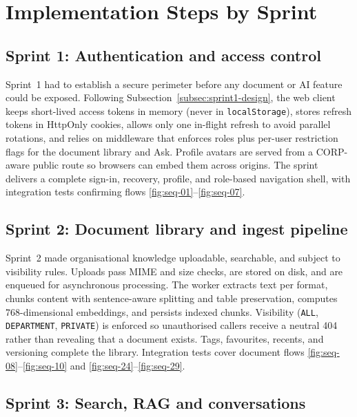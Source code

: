 \section{Implementation Steps by Sprint}

\subsection{Sprint 1: Authentication and access control}
\label{subsec:impl-sprint1}

Sprint~1 had to establish a secure perimeter before any document or AI feature
could be exposed. Following Subsection~\ref{subsec:sprint1-design}, the web
client keeps short-lived access tokens in memory (never in \texttt{localStorage}),
stores refresh tokens in HttpOnly cookies, allows only one in-flight refresh to
avoid parallel rotations, and relies on middleware that enforces roles plus
per-user restriction flags for the document library and Ask. Profile avatars are
served from a CORP-aware public route so browsers can embed them across origins.
The sprint delivers a complete sign-in, recovery, profile, and role-based
navigation shell, with integration tests confirming flows
\ref{fig:seq-01}--\ref{fig:seq-07}.



\subsection{Sprint 2: Document library and ingest pipeline}
\label{subsec:impl-sprint2}

Sprint~2 made organisational knowledge uploadable, searchable, and subject to
visibility rules. Uploads pass MIME and size checks, are stored on disk, and are
enqueued for asynchronous processing. The worker extracts text per format, chunks
content with sentence-aware splitting and table preservation, computes
768-dimensional embeddings, and persists indexed chunks. Visibility
(\texttt{ALL}, \texttt{DEPARTMENT}, \texttt{PRIVATE}) is enforced so
unauthorised callers receive a neutral 404 rather than revealing that a document
exists. Tags, favourites, recents, and versioning complete the library. Integration
tests cover document flows
\ref{fig:seq-08}--\ref{fig:seq-10} and \ref{fig:seq-24}--\ref{fig:seq-29}.



\subsection{Sprint 3: Search, RAG and conversations}
\label{subsec:impl-sprint3}

